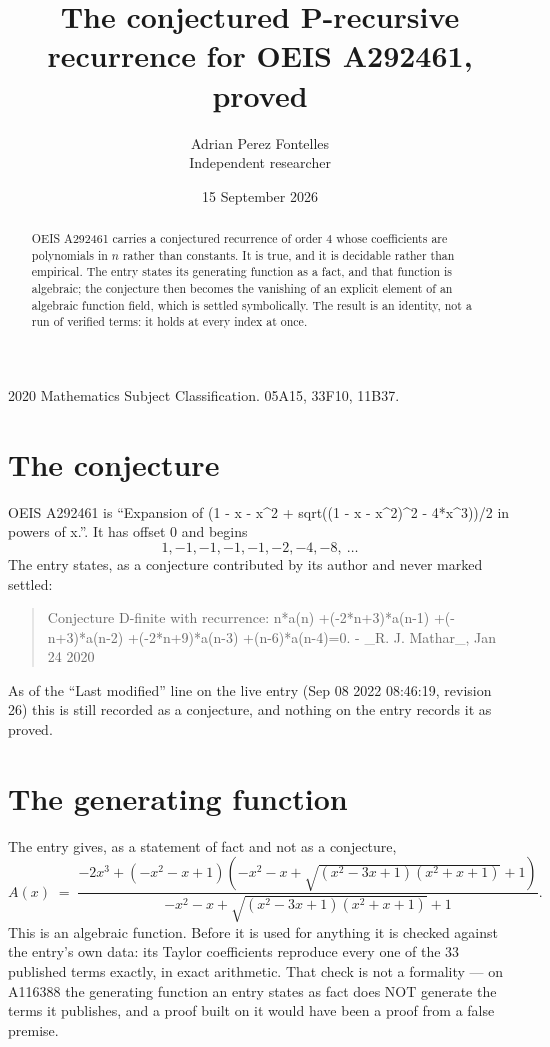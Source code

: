 \documentclass[11pt,a4paper]{article}
\title{The conjectured P-recursive recurrence for OEIS A292461, proved}
\author{Adrian Perez Fontelles\\ \small Independent researcher}
\date{15 September 2026}
\theoremstyle{plain}
\theoremstyle{definition}
\begin{document}
\maketitle

\begin{abstract}
OEIS A292461 carries a conjectured recurrence of order $4$ whose coefficients are polynomials in
$n$ rather than constants. It is true, and it is decidable rather than empirical. The entry
states its generating function as a fact, and that function is algebraic; the conjecture then
becomes the vanishing of an explicit element of an algebraic function field, which is settled
symbolically. The result is an identity, not a run of verified terms: it holds at every index
at once.
\end{abstract}

\noindent\small 2020 Mathematics Subject Classification. 05A15, 33F10, 11B37.\normalsize

\section{The conjecture}

OEIS A292461 is ``Expansion of (1 - x - x\^{}2 + sqrt((1 - x - x\^{}2)\^{}2 - 4*x\^{}3))/2 in powers of x.''. It has offset $0$ and begins
\[
1, -1, -1, -1, -1, -2, -4, -8,\ \dots
\]
The entry states, as a conjecture contributed by its author and never marked settled:
\begin{quote}\raggedright\small
Conjecture D-finite with recurrence: n*a(n) +(-2*n+3)*a(n-1) +(-n+3)*a(n-2) +(-2*n+9)*a(n-3) +(n-6)*a(n-4)=0. - \_R. J. Mathar\_, Jan 24 2020
\end{quote}
As of the ``Last modified'' line on the live entry (Sep 08 2022 08:46:19, revision 26)
this is still recorded as a conjecture, and nothing on the entry records it as proved.

\section{The generating function}

The entry gives, as a statement of fact and not as a conjecture,
\[
A(x)\;=\;\frac{- 2 x^{3} + \left(- x^{2} - x + 1\right) \left(- x^{2} - x + \sqrt{\left(x^{2} - 3 x + 1\right) \left(x^{2} + x + 1\right)} + 1\right)}{- x^{2} - x + \sqrt{\left(x^{2} - 3 x + 1\right) \left(x^{2} + x + 1\right)} + 1} .
\]
This is an algebraic function. Before it is used for anything it is checked against the entry's
own data: its Taylor coefficients reproduce every one of the $33$ published terms
exactly, in exact arithmetic. That check is not a formality --- on A116388 the generating
function an entry states as fact does NOT generate the terms it publishes, and a proof built on
it would have been a proof from a false premise.
\end{document}
